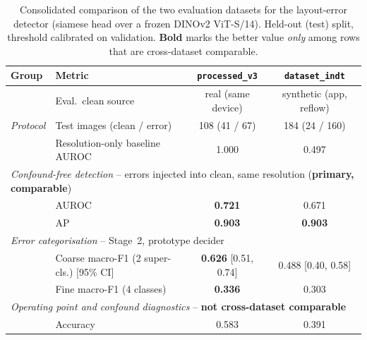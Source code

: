 
\begin{table}[t]
\centering
\caption{Consolidated comparison of the two evaluation datasets for the layout-error
detector (siamese head over a frozen DINOv2 ViT-S/14). Held-out (test) split, threshold
calibrated on validation. \textbf{Bold} marks the better value \emph{only} among rows that
are cross-dataset comparable.}
\label{tab:dataset-comparison}
\begin{threeparttable}
\begin{tabular}{l l c c}
\toprule
\textbf{Group} & \textbf{Metric} & \textbf{\texttt{processed\_v3}} & \textbf{\texttt{dataset\_indt}} \\
\midrule
\multirow{3}{*}{\textit{Protocol}}
 & Eval.\ clean source            & real (same device) & synthetic (app, reflow)\tnote{a} \\
 & Test images (clean / error)    & 108 (41 / 67)      & 184 (24 / 160) \\
 & Resolution-only baseline AUROC & 1.000\tnote{b}     & 0.497 \\
\midrule
\multicolumn{4}{l}{\textit{Confound-free detection} -- errors injected into clean, same resolution (\textbf{primary, comparable})} \\
 & AUROC & \textbf{0.721} & 0.671 \\
 & AP    & \textbf{0.903} & \textbf{0.903} \\
\midrule
\multicolumn{4}{l}{\textit{Error categorisation} -- Stage~2, prototype decider} \\
 & Coarse macro-F1 (2 super-cls.) [95\% CI] & \textbf{0.626} [0.51, 0.74] & 0.488 [0.40, 0.58] \\
 & Fine macro-F1 (4 classes)                & \textbf{0.336}             & 0.303 \\
\midrule
\multicolumn{4}{l}{\textit{Operating point and confound diagnostics} -- \textbf{not cross-dataset comparable}\tnote{c}} \\
 & Accuracy                          & 0.583 & 0.391 \\

\end{tabular}
\end{threeparttable}
\end{table}
